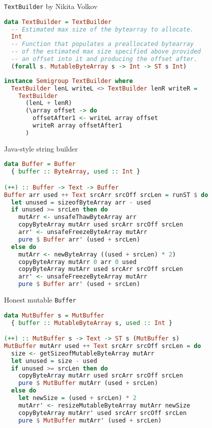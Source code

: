 \documentclass[handout]{beamer}
\begin{document}
\begin{frame}[fragile]{{\tt TextBuilder} by Nikita Volkov}

\begin{lstlisting}[language=Haskell]
data TextBuilder = TextBuilder
  -- Estimated max size of the bytearray to allocate.
  Int
  -- Function that populates a preallocated bytearray
  -- of the estimated max size specified above provided
  -- an offset into it and producing the offset after.
  (forall s. MutableByteArray s -> Int -> ST s Int)
\end{lstlisting}

\begin{lstlisting}[language=Haskell]
instance Semigroup TextBuilder where
  TextBuilder lenL writeL <> TextBuilder lenR writeR =
    TextBuilder
      (lenL + lenR)
      (\array offset -> do
        offsetAfter1 <- writeL array offset
        writeR array offsetAfter1
      )
\end{lstlisting}

\end{frame}

\begin{frame}[fragile]{Java-style string builder}

\begin{lstlisting}[language=Haskell]
data Buffer = Buffer
  { buffer :: ByteArray, used :: Int }

(++) :: Buffer -> Text -> Buffer
Buffer arr used ++ Text srcArr srcOff srcLen = runST $ do
  let unused = sizeofByteArray arr - used
  if unused >= srcLen then do
    mutArr <- unsafeThawByteArray arr
    copyByteArray mutArr used srcArr srcOff srcLen
    arr' <- unsafeFreezeByteArray mutArr
    pure $ Buffer arr' (used + srcLen)
  else do
    mutArr <- newByteArray ((used + srcLen) * 2)
    copyByteArray mutArr 0 arr 0 used
    copyByteArray mutArr used srcArr srcOff srcLen
    arr' <- unsafeFreezeByteArray mutArr
    pure $ Buffer arr' (used + srcLen)
\end{lstlisting}

\end{frame}

\begin{frame}[fragile]{Honest mutable {\tt Buffer}}

\begin{lstlisting}[language=Haskell]
data MutBuffer s = MutBuffer
  { buffer :: MutableByteArray s, used :: Int }

(++) :: MutBuffer s -> Text -> ST s (MutBuffer s)
MutBuffer mutArr used ++ Text srcArr srcOff srcLen = do
  size <- getSizeofMutableByteArray mutArr
  let unused = size - used
  if unused >= srcLen then do
    copyByteArray mutArr used srcArr srcOff srcLen
    pure $ MutBuffer mutArr (used + srcLen)
  else do
    let newSize = (used + srcLen) * 2
    mutArr' <- resizeMutableByteArray mutArr newSize
    copyByteArray mutArr' used srcArr srcOff srcLen
    pure $ MutBuffer mutArr' (used + srcLen)
\end{lstlisting}

\end{frame}
\end{document}
